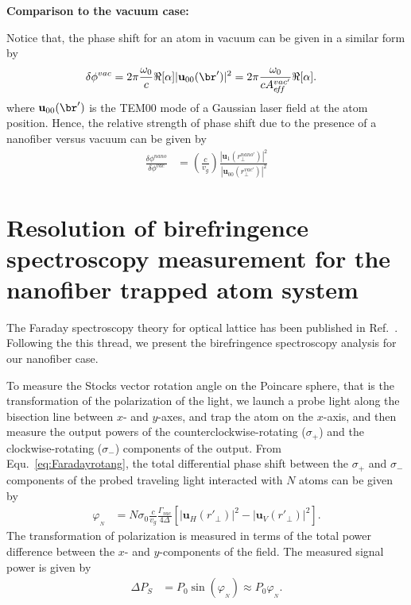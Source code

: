 \documentclass[]{report}
\begin{document}
\bigskip
\textbf{Comparison to the vacuum case:}

Notice that, the phase shift for an atom in vacuum can be given in a similar form by
\begin{align}
\delta\phi^{vac} &= 2\pi \frac{\omega_0}{c} \Re[\alpha] |\mathbf{u}_{00}(\br')|^2 =  2\pi \frac{\omega_0}{c A^{vac'}_{e\!f\!f}} \Re[\alpha].
\end{align}
where $\mathbf{u}_{00}(\br')  $ is the TEM00 mode of a Gaussian laser field at the atom position. Hence, the relative strength of phase shift due to the presence of a nanofiber versus vacuum can be given by
\begin{align}
\frac{\delta\phi^{nano}}{\delta\phi^{vac}} &= \left(\!\frac{c}{v_g}\!\right)\frac{|\mathbf{u}_1(r_\perp^{nano'})|^2}{|\mathbf{u}_{00}(r_\perp^{vac'})|^2}
\end{align}

\section{Resolution of birefringence spectroscopy measurement for the nanofiber trapped atom system}
The Faraday spectroscopy theory for optical lattice has been published in Ref.~\cite{Smith2003a}. Following the this thread, we present the birefringence spectroscopy analysis for our nanofiber case.

To measure the Stocks vector rotation angle on the Poincare sphere, that is the transformation of the polarization of the light, we launch a probe light along the bisection line between $ x $- and $ y $-axes, and trap the atom on the $ x $-axis, and then measure the output powers of the counterclockwise-rotating ($ \sigma_+ $) and the clockwise-rotating ($ \sigma_- $) components of the output. From Equ.~\eqref{eq:Faradayrotang}, the total differential phase shift between the $ \sigma_+ $ and $ \sigma_- $ components of the probed traveling light interacted with $ N $ atoms can be given by
\begin{align}
\varphi_{_N} &= N\sigma_0\frac{c}{v_g}\frac{\Gamma_{vac}}{4\Delta}\left[| \mathbf{u}_H(r'_{\!\perp})|^2- | \mathbf{u}_V(r'_{\!\perp})|^2 \right].
\end{align}
The transformation of polarization is measured in terms of the total power difference between the $ x $- and $ y $-components of the field. The measured signal power is given by
\begin{align}
\Delta P_S &= P_0 \sin(\varphi_{_N}) \approx P_0 \varphi_{_N}. \label{eq:polsignal}
\end{align}
\end{document}
